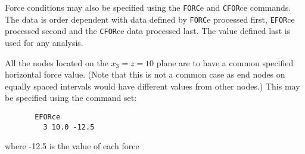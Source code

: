 Force conditions may also be specified using the {\tt FORC}e and {\tt CFOR}ce
commands.  The data is order dependent with data
defined by {\tt FORC}e processed first, {\tt EFOR}ce processed second and
the {\tt CFOR}ce data processed last.  The value defined last is used for
any analysis.
\pagebreak


All the nodes located on the $x_3 = z = 10$ plane are to have a common specified
horizontal
force value. (Note that this is not a common case as end nodes on equally
spaced intervals would have different values from other nodes.)
This may be specified using the command set:
\begin{verbatim}
       EFORce
         3 10.0 -12.5
\end{verbatim}
where -12.5 is the value of each force
\vfil\eject
